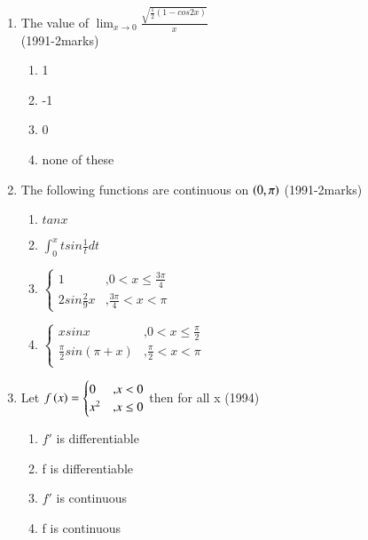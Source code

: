 \documentclass[journal,12pt,twocolumn]{IEEEtran}
\theoremstyle{remark}
\begin{document}
\begin{enumerate}
\item The value of $\lim_{x\to0}{\frac{\sqrt{\frac{1}{2}(1-cos2x)}}{x}}$ \\
\hfill{(1991-2marks)} 
\begin{enumerate}
    \item 1
    \item -1
    \item 0
    \item none of these \\
\end{enumerate}
\item The following functions are continuous on $\brak{0,\pi}$ \hfill{(1991-2marks)} 
\begin{enumerate}
    \item $tanx$
    \item $\int_{0}^{x}tsin\frac{1}{t}dt$ 
    \item $\begin{cases} 1 & \text{,} 0<x\leq\frac{3\pi}{4} \\
                2sin\frac{2}{9}x & \text{,} \frac{3\pi}{4}<x<\pi
    
\end{cases}$
    \item $\begin{cases} xsinx & \text{,} 0<x\leq\frac{\pi}{2} \\
                  \frac{\pi}{2}sin(\pi+x) & \text{,} \frac{\pi}{2}<x<\pi \\ 
\end{cases}$
\end{enumerate}
\item Let $f\brak{x}=\begin{cases} 0 & \text{,} x<0 \\
                             x^2 & \text{,} x\leq0
\end{cases}$ then for all x \hfill{(1994)} 

\begin{enumerate}
    \item $f\prime$ is differentiable
    \item f is differentiable
    \item $f\prime$ is continuous 
    \item f is continuous
\end{enumerate}


\end{enumerate}
\end{document}
